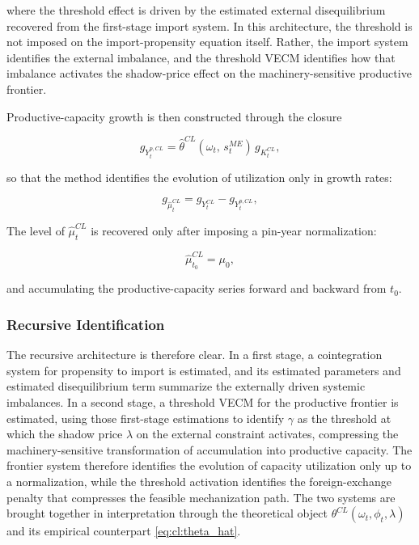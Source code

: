 \documentclass[11pt,a4paper]{article}
\begin{document}
{where the threshold effect is driven by the estimated external
disequilibrium recovered from the first-stage import system. In this
architecture, the threshold is not imposed on the import-propensity
equation itself. Rather, the import system identifies the external
imbalance, and the threshold VECM identifies how that imbalance
activates the shadow-price effect on the machinery-sensitive productive
frontier.

Productive-capacity growth is then constructed through the closure

\begin{equation}
	g_{Y_t^{p,CL}}
	=
	\hat{\theta}^{CL}(\omega_t,\, s_t^{ME})\,g_{K_t^{CL}},
	\label{eq:cl:frontier_growth}
\end{equation}

so that the method identifies the evolution of utilization only in
growth rates:

\begin{equation}
	g_{\hat{\mu}_t^{CL}}
	=
	g_{Y_t^{CL}}
	-
	g_{Y_t^{p,CL}},
	\label{eq:cl:mu_growth}
\end{equation}

The level of $\hat{\mu}_t^{CL}$ is recovered only after imposing a
pin-year normalization:

\begin{equation}
	\hat{\mu}_{t_0}^{CL}
	=
	\mu_0,
	\label{eq:cl:mu_pin}
\end{equation}

and accumulating the productive-capacity series forward and backward
from $t_0$.

\subsubsection{Recursive Identification}
\label{subsec:chile_recursive}

The recursive architecture is therefore clear. In a first stage, a
cointegration system for propensity to import is estimated, and its
estimated parameters and estimated disequilibrium term summarize the
externally driven systemic imbalances. In a second stage, a threshold
VECM for the productive frontier is estimated, using those first-stage
estimations to identify $\gamma$ as the threshold at which the shadow
price $\lambda$ on the external constraint activates, compressing the
machinery-sensitive transformation of accumulation into productive
capacity. The frontier system therefore identifies the evolution of
capacity utilization only up to a normalization, while the threshold
activation identifies the foreign-exchange penalty that compresses the
feasible mechanization path. The two systems are brought together in
interpretation through the theoretical object
$\theta^{CL}(\omega_t,\phi_t,\lambda)$ and its empirical counterpart
\eqref{eq:cl:theta_hat}.


}
\end{document}

